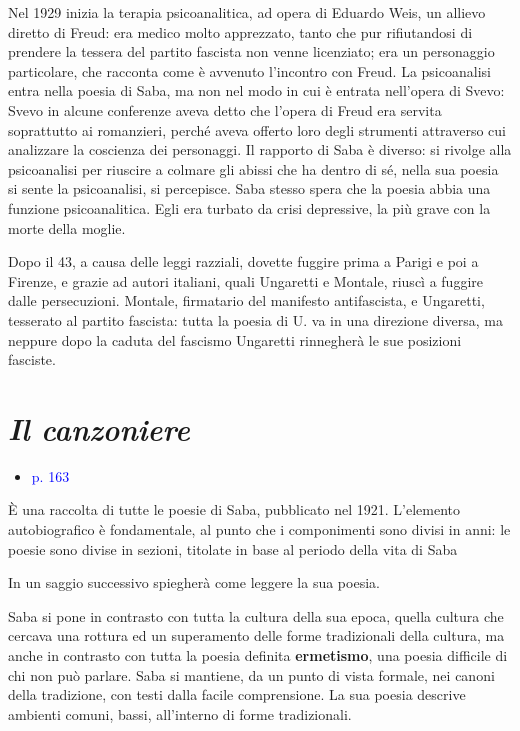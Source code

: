 \documentclass[a4paper, twoside, titlepage]{book}
\newcounter{mar}
\newcommand{\elenco}[1]{%
\begin{itemize}
#1
\end{itemize}}
\renewcommand{\emph}[1]{\textcolor{blue}{#1}}
\begin{document}
Nel 1929 inizia la terapia psicoanalitica, ad opera di Eduardo Weis, un allievo diretto di Freud: era medico molto apprezzato, tanto che pur rifiutandosi di prendere la tessera del partito fascista non venne licenziato; era un personaggio particolare, che racconta come è avvenuto l'incontro con Freud. 
La psicoanalisi entra nella poesia di Saba, ma non nel modo in cui è entrata nell'opera di Svevo: Svevo in alcune conferenze aveva detto che l'opera di Freud era servita soprattutto ai romanzieri, perché aveva offerto loro degli strumenti attraverso cui analizzare la coscienza dei personaggi. Il rapporto di Saba è diverso: si rivolge alla psicoanalisi per riuscire a colmare gli abissi che ha dentro di sé, nella sua poesia si sente la psicoanalisi, si percepisce.
Saba stesso spera che la poesia abbia una funzione psicoanalitica. Egli era turbato da crisi depressive, la più grave con la morte della moglie.

Dopo il 43, a causa delle leggi razziali, dovette fuggire prima a Parigi e poi a Firenze, e grazie ad autori italiani, quali Ungaretti e Montale, riuscì a fuggire dalle persecuzioni.
Montale, firmatario del manifesto antifascista, e Ungaretti, tesserato al partito fascista: tutta la poesia di U. va in una direzione diversa, ma neppure dopo la caduta del fascismo Ungaretti rinnegherà le sue posizioni fasciste.

\section{\textit{Il canzoniere}}
\elenco{\item \emph{p. 163}}

È una raccolta di tutte le poesie di Saba, pubblicato nel 1921.
L'elemento autobiografico è fondamentale, al punto che i componimenti sono divisi in anni: le poesie sono divise in sezioni, titolate in base al periodo della vita di Saba %

In un saggio successivo spiegherà come leggere la sua poesia.

Saba si pone in contrasto con tutta la cultura della sua epoca, quella cultura che cercava una rottura ed un superamento delle forme tradizionali della cultura, ma anche in contrasto con tutta la poesia definita \textbf{ermetismo}, una poesia difficile di chi non può parlare.
Saba si mantiene, da un punto di vista formale, nei canoni della tradizione, con testi dalla facile comprensione.
La sua poesia descrive ambienti comuni, bassi, all'interno di forme tradizionali.
\end{document}
